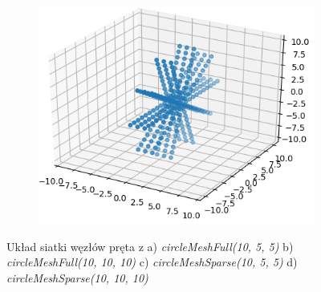\begin{figure}
\begin{subfigure}{.5\textwidth}
  \caption{}
  \label{fig:sfig3}
\end{subfigure}%
\begin{subfigure}{.5\textwidth}
  \centering
  \includegraphics[width=.8\linewidth]{Zdjecia/5/pret4}
  \caption{}
  \label{fig:sfig4}
\end{subfigure} 
\caption{Układ siatki węzłów pręta z a) \textit{circleMeshFull(10, 5, 5)} b) \textit{circleMeshFull(10, 10, 10)} c) \textit{circleMeshSparse(10, 5, 5)} d) \textit{circleMeshSparse(10, 10, 10)}}
\label{fig:pret}
\end{figure}

